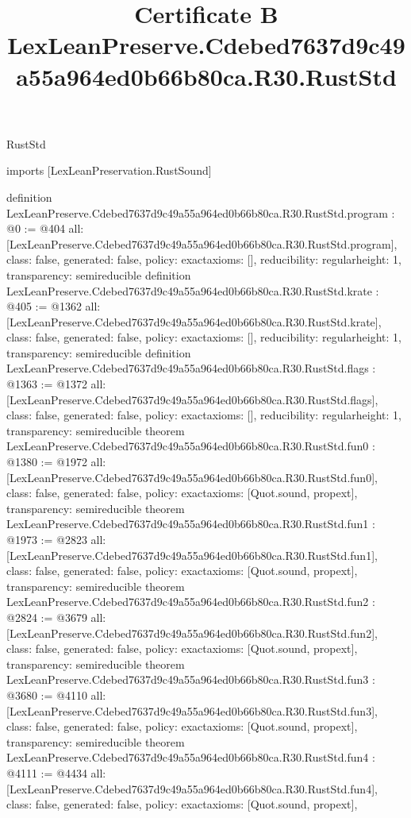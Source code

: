 \begin{lexlean}{RustStd}
\title{Certificate B LexLeanPreserve.Cdebed7637d9c49a55a964ed0b66b80ca.R30.RustStd}
\begin{coremodule}
imports [LexLeanPreservation.RustSound]

definition LexLeanPreserve.Cdebed7637d9c49a55a964ed0b66b80ca.R30.RustStd.program : @0 := @404 {
  all: [LexLeanPreserve.Cdebed7637d9c49a55a964ed0b66b80ca.R30.RustStd.program],
  class: false,
  generated: false,
  policy: exact{axioms: []},
  reducibility: regular{height: 1},
  transparency: semireducible
}
definition LexLeanPreserve.Cdebed7637d9c49a55a964ed0b66b80ca.R30.RustStd.krate : @405 := @1362 {
  all: [LexLeanPreserve.Cdebed7637d9c49a55a964ed0b66b80ca.R30.RustStd.krate],
  class: false,
  generated: false,
  policy: exact{axioms: []},
  reducibility: regular{height: 1},
  transparency: semireducible
}
definition LexLeanPreserve.Cdebed7637d9c49a55a964ed0b66b80ca.R30.RustStd.flags : @1363 := @1372 {
  all: [LexLeanPreserve.Cdebed7637d9c49a55a964ed0b66b80ca.R30.RustStd.flags],
  class: false,
  generated: false,
  policy: exact{axioms: []},
  reducibility: regular{height: 1},
  transparency: semireducible
}
theorem LexLeanPreserve.Cdebed7637d9c49a55a964ed0b66b80ca.R30.RustStd.fun0 : @1380 := @1972 {
  all: [LexLeanPreserve.Cdebed7637d9c49a55a964ed0b66b80ca.R30.RustStd.fun0],
  class: false,
  generated: false,
  policy: exact{axioms: [Quot.sound, propext]},
  transparency: semireducible
}
theorem LexLeanPreserve.Cdebed7637d9c49a55a964ed0b66b80ca.R30.RustStd.fun1 : @1973 := @2823 {
  all: [LexLeanPreserve.Cdebed7637d9c49a55a964ed0b66b80ca.R30.RustStd.fun1],
  class: false,
  generated: false,
  policy: exact{axioms: [Quot.sound, propext]},
  transparency: semireducible
}
theorem LexLeanPreserve.Cdebed7637d9c49a55a964ed0b66b80ca.R30.RustStd.fun2 : @2824 := @3679 {
  all: [LexLeanPreserve.Cdebed7637d9c49a55a964ed0b66b80ca.R30.RustStd.fun2],
  class: false,
  generated: false,
  policy: exact{axioms: [Quot.sound, propext]},
  transparency: semireducible
}
theorem LexLeanPreserve.Cdebed7637d9c49a55a964ed0b66b80ca.R30.RustStd.fun3 : @3680 := @4110 {
  all: [LexLeanPreserve.Cdebed7637d9c49a55a964ed0b66b80ca.R30.RustStd.fun3],
  class: false,
  generated: false,
  policy: exact{axioms: [Quot.sound, propext]},
  transparency: semireducible
}
theorem LexLeanPreserve.Cdebed7637d9c49a55a964ed0b66b80ca.R30.RustStd.fun4 : @4111 := @4434 {
  all: [LexLeanPreserve.Cdebed7637d9c49a55a964ed0b66b80ca.R30.RustStd.fun4],
  class: false,
  generated: false,
  policy: exact{axioms: [Quot.sound, propext]},
}
\end{coremodule}
\end{lexlean}
